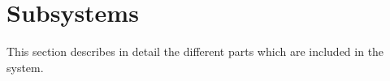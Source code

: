 \section{Subsystems}
This section describes in detail the different parts which are included in the system.














